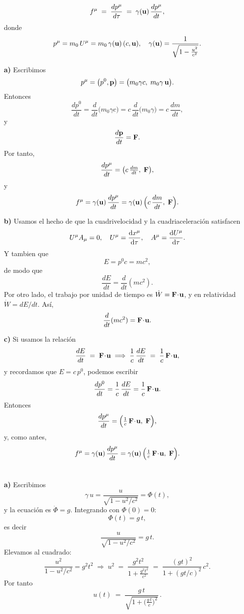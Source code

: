 \documentclass{article}
\begin{document}
\section{}
\[
f^\mu \;=\;\frac{dp^\mu}{d\tau}
\;=\;\gamma(\vb u)\,\frac{dp^\mu}{dt},
\]
donde
\[
p^\mu = m_0\,U^\mu = m_0\,\gamma(\vb u)\,(c,\vb u),
\quad
\gamma(\vb u)=\frac1{\sqrt{1-\tfrac{u^2}{c^2}}}.
\]


\textbf{a) } Escribimos
\[
p^\mu = \bigl(p^0,\vb p\bigr)
         = \bigl(m_0\gamma c,\;m_0\gamma\,\vb u\bigr).
\]
Entonces
\[
\frac{dp^0}{dt}
= \frac{d}{dt}\bigl(m_0\gamma c\bigr)
= c\,\frac{d}{dt}\bigl(m_0\gamma\bigr)
= c\,\frac{dm}{dt},
\]
y
\[
\frac{d\vb p}{dt} = \vb F.
\]
Por tanto,
\[
\frac{dp^\mu}{dt}
= \bigl(c\,\tfrac{dm}{dt},\;\vb F\bigr),
\]
y
\[
f^\mu
= \gamma(\vb u)\,\frac{dp^\mu}{dt}
= \gamma(\vb u)\,
  \Bigl(c\,\frac{dm}{dt},\;\vb F\Bigr).
\]


\textbf{b) }Usamos el hecho de que la cuadrivelocidad y la cuadriaceleración satisfacen
\[
U^\mu A_\mu = 0,
\quad
U^\mu = \dv{x^\mu}{\tau}, \quad
A^\mu = \dv{U^\mu}{\tau}.
\]
Y tambien que
\[
E = p^0 c = m c^2,
\]
de modo que
\[
\frac{dE}{dt} = \frac{d}{dt}(mc^2).
\]
Por otro lado,
el trabajo por unidad de tiempo es
\(\dot W = \vb F\!\cdot\!\vb u\), y en relatividad
\(\dot W=dE/dt\). Así,
\[
\frac{d}{dt}(m c^2)
= \vb F\!\cdot\!\vb u.
\]



\textbf{c) }Si usamos la relación
\[
\frac{dE}{dt} \;=\;\vb F\!\cdot\!\vb u
\;\Longrightarrow\;
\frac{1}{c}\,\frac{dE}{dt} \;=\;\frac{1}{c}\,\vb F\!\cdot\!\vb u,
\]
y recordamos que \(E=c\,p^0\), podemos escribir
\[
\frac{dp^0}{dt}
= \frac{1}{c}\,\frac{dE}{dt}
= \frac{1}{c}\,\vb F\!\cdot\!\vb u.
\]
Entonces
\[
\frac{dp^\mu}{dt}
= \Bigl(\tfrac{1}{c}\,\vb F\!\cdot\!\vb u,\;\vb F\Bigr),
\]
y, como antes,
\[
f^\mu
= \gamma(\vb u)\,\frac{dp^\mu}{dt}
= \gamma(\vb u)\,
  \Bigl(\tfrac{1}{c}\,\vb F\!\cdot\!\vb u,\;\vb F\Bigr).
\]




\section{}

\textbf{a) }Escribimos
\[
\gamma\,u = \frac{u}{\sqrt{1-u^2/c^2}} = \Phi(t),
\]
y la ecuación es \(\dot\Phi = g\). Integrando con \(\Phi(0)=0\):
\[
\Phi(t) = g\,t,
\]
es decir
\[
\frac{u}{\sqrt{1-u^2/c^2}} = g\,t.
\]
Elevamos al cuadrado:
\[
\frac{u^2}{1-u^2/c^2} = g^2 t^2
\;\Longrightarrow\;
u^2 \;=\; \frac{g^2 t^2}{1 + \frac{g^2 t^2}{c^2}}
\;=\; \frac{(g t)^2}{1 + (g t/c)^2}\,c^2.
\]
Por tanto
\[
u(t) \;=\; \frac{g\,t}{\sqrt{1 + \bigl(\tfrac{g\,t}{c}\bigr)^2}}\,.
\]
\end{document}
